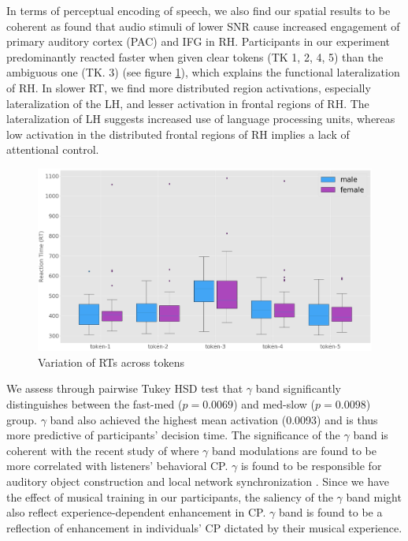 \documentclass{article}
\begin{document}
In terms of perceptual encoding of speech, we also find our spatial results to be coherent as \cite{Bidelman2016FunctionalCI} found that audio stimuli of lower SNR cause increased engagement of primary auditory cortex (PAC) and IFG in RH. Participants in our experiment predominantly reacted faster when given clear tokens (TK 1, 2, 4, 5) than the ambiguous one (TK. 3) (see figure \ref{RT_var}), which explains the functional lateralization of RH. In slower RT, we find more distributed region activations, especially lateralization of the LH, and lesser activation in frontal regions of RH. The lateralization of LH suggests increased use of language processing units, whereas low activation in the distributed frontal regions of RH implies a lack of attentional control.

\begin{figure}[ht]
\vskip 0.2in
\begin{center}
\centerline{\includegraphics[width=\columnwidth]{Images/RT_var}}
\caption[Ranked spatial features by activation values]{Variation of RTs across tokens}
\end{center}
\vskip -0.2in
\label{RT_var}
\end{figure}

We assess through pairwise Tukey HSD test that $\gamma$ band significantly distinguishes between the fast-med ($p = 0.0069$) and med-slow ($p = 0.0098$) group. $\gamma$ band also achieved the highest mean activation (0.0093) and is thus more predictive of participants' decision time. The significance of the $\gamma$ band is coherent with the recent study of \cite{Mahmud2020} where $\gamma$ band modulations are found to be more correlated with listeners' behavioral CP. $\gamma$ is found to be responsible for auditory object construction \cite{obj_con_gamma} and local network synchronization \cite{net_gamma1, net_gamma2, net_gamma3}. Since we have the effect of musical training in our participants, the saliency of the $\gamma$ band might also reflect experience-dependent enhancement in CP. $\gamma$ band is found to be a reflection of enhancement in individuals' CP dictated by their musical experience.
\end{document}
